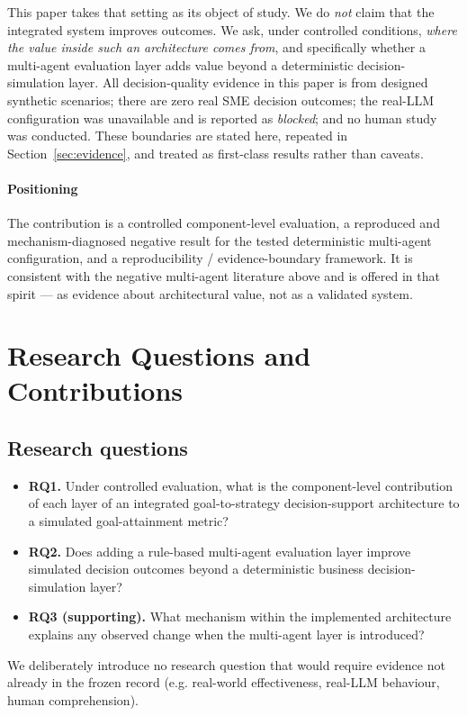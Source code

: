 \documentclass[conference]{IEEEtran}
\begin{document}
This paper takes that setting as its object of study. We do \emph{not} claim
that the integrated system improves outcomes. We ask, under controlled
conditions, \emph{where the value inside such an architecture comes from}, and
specifically whether a multi-agent evaluation layer adds value beyond a
deterministic decision-simulation layer. All decision-quality evidence in this
paper is from designed synthetic scenarios; there are zero real SME decision
outcomes; the real-LLM configuration was unavailable and is reported as
\emph{blocked}; and no human study was conducted. These boundaries are stated
here, repeated in Section~\ref{sec:evidence}, and treated as first-class results
rather than caveats.

\paragraph{Positioning}
The contribution is a controlled component-level evaluation, a reproduced and
mechanism-diagnosed negative result for the tested deterministic multi-agent
configuration, and a reproducibility / evidence-boundary framework. It is
consistent with the negative multi-agent literature above and is offered in that
spirit --- as evidence about architectural value, not as a validated system.

\section{Research Questions and Contributions}
\label{sec:rq}

\subsection{Research questions}
\begin{itemize}
\item \textbf{RQ1.} Under controlled evaluation, what is the component-level
contribution of each layer of an integrated goal-to-strategy decision-support
architecture to a simulated goal-attainment metric?
\item \textbf{RQ2.} Does adding a rule-based multi-agent evaluation layer improve
simulated decision outcomes beyond a deterministic business decision-simulation
layer?
\item \textbf{RQ3 (supporting).} What mechanism within the implemented
architecture explains any observed change when the multi-agent layer is
introduced?
\end{itemize}
We deliberately introduce no research question that would require evidence not
already in the frozen record (e.g. real-world effectiveness, real-LLM behaviour,
human comprehension).
\end{document}
